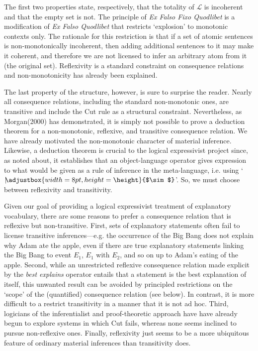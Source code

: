 \documentclass{article}
\newcommand{\ssim}{%
     \setbox0=\hbox{$\sim$}%
     \adjustbox{width=8pt,height=\height}{$\sim$}
}
\newcommand{\nmc}{\mathbin{\mid\joinrel\!\!\ssim}}
\begin{document}
The first two properties state, respectively, that the totality of $ \mathcal{L} $ is incoherent and that the empty set is not. The principle of \textit{Ex Falso Fixo Quodlibet} is a modification of \textit{Ex Falso Quodlibet} that restricts `explosion' to monotonic contexts only. The rationale for this restriction is that if a set of atomic sentences is non-monotonically incoherent, then adding additional sentences to it may make it coherent, and therefore we are not licensed to infer an arbitrary atom from it (the original set). Reflexivity is a standard constraint on consequence relations and non-monotonicity has already been explained. 

The last property of the structure, however, is sure to surprise the reader. Nearly all consequence relations, including the standard non-monotonic ones, are transitive and include the Cut rule as a structural constraint. Nevertheless, as Morgan(2000) has demonstrated, it is simply not possible to prove a deduction theorem for a non-monotonic, reflexive, and transitive consequence relation. We have already motivated the non-monotonic character of material inference. Likewise, a deduction theorem is crucial to the logical expressivist project since, as noted about, it establishes that an object-language operator gives expression to what would be given as a rule of inference in the meta-language, i.e. using `$ \nmc $'. So, we must choose between  reflexivity and transitivity. 

Given our goal of providing a logical expressivist treatment of explanatory vocabulary, there are some reasons to prefer a consequence relation that is reflexive but non-transitive. First, sets of explanatory statements often fail to license transitive inferences---e.g. the occurrence of the Big Bang does not explain why Adam ate the apple, even if there are true explanatory statements linking the Big Bang to event $E_1$, $ E_1 $ with $ E_2 $, and so on up to Adam's eating of the apple. Second, while an unrestricted reflexive consequence relation made explicit by the \textit{best explains} operator entails that a statement is the best explanation of itself, this unwanted result can be avoided by principled restrictions on the `scope' of the (quantified) consequence relation (see below). In contrast, it is more difficult to a restrict transitivity in a manner that it is not ad hoc. Third, logicians of the inferentialist and proof-theoretic approach have have already begun to explore systems in which Cut fails, whereas none seems inclined to pursue non-reflexive ones. Finally, reflexivity just seems to be a more ubiquitous feature of ordinary material inferences than transitivity does.
\end{document}
